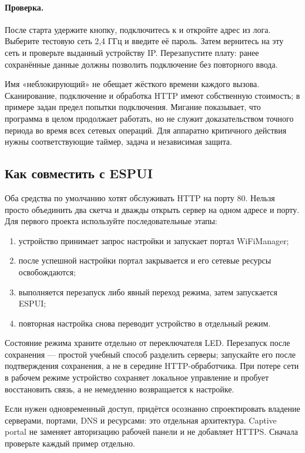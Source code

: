 \paragraph{Проверка.}
После старта удержите кнопку, подключитесь к  и откройте адрес из лога.
Выберите тестовую сеть 2,4 ГГц и введите её пароль. Затем вернитесь на эту сеть
и проверьте выданный устройству IP. Перезапустите плату: ранее сохранённые данные
должны позволить подключение без повторного ввода.

Имя «неблокирующий» не обещает жёсткого времени каждого вызова. Сканирование,
подключение и обработка HTTP имеют собственную стоимость; в примере задан предел попытки
подключения. Мигание показывает, что программа в целом продолжает работать, но не служит
доказательством точного периода во время всех сетевых операций.
Для аппаратно критичного действия нужны соответствующие таймер, задача и независимая защита.

\subsection{Как совместить с ESPUI}

Оба средства по умолчанию хотят обслуживать HTTP на порту 80. Нельзя просто объединить
два скетча и дважды открыть сервер на одном адресе и порту.
Для первого проекта используйте последовательные этапы:

\begin{enumerate}
  \item устройство принимает запрос настройки и запускает портал WiFiManager;
  \item после успешной настройки портал закрывается и его сетевые ресурсы освобождаются;
  \item выполняется перезапуск либо явный переход режима, затем запускается ESPUI;
  \item повторная настройка снова переводит устройство в отдельный режим.
\end{enumerate}

Состояние режима храните отдельно от переключателя LED. Перезапуск после сохранения ---
простой учебный способ разделить серверы; запускайте его после подтверждения сохранения,
а не в середине HTTP-обработчика. При потере сети в рабочем режиме устройство сохраняет
локальное управление и пробует восстановить связь, а не немедленно возвращается к настройке.

Если нужен одновременный доступ, придётся осознанно спроектировать владение серверами,
портами, DNS и ресурсами: это отдельная архитектура. Captive portal не заменяет авторизацию
рабочей панели и не добавляет HTTPS. Сначала проверьте каждый пример отдельно.

